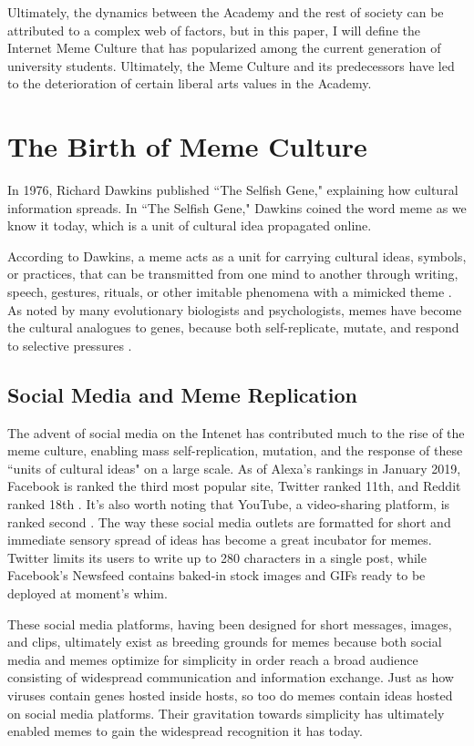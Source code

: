 \documentclass[12pt,letterpaper]{article}
\begin{document}
Ultimately, the dynamics between the Academy and the rest of society can be attributed to a complex web of factors, but in this paper, I will define the Internet Meme Culture that has popularized among the current generation of university students.  Ultimately, the Meme Culture and its predecessors have led to the deterioration of certain liberal arts values in the Academy.

\section{The Birth of Meme Culture}

In 1976, Richard Dawkins published ``The Selfish Gene," explaining how cultural information spreads.  In ``The Selfish Gene," Dawkins coined the word meme as we know it today, which is a unit of cultural idea propagated online.

According to Dawkins, a meme acts as a unit for carrying cultural ideas, symbols, or practices, that can be transmitted from one mind to another through writing, speech, gestures, rituals, or other imitable phenomena with a mimicked theme \cite{noauthor_selfish_2019}.  As noted by many evolutionary biologists and psychologists, memes have become the cultural analogues to genes, because both self-replicate, mutate, and respond to selective pressures \cite{noauthor_pdf_nodate}.

\subsection{Social Media and Meme Replication}
The advent of social media on the Intenet has contributed much to the rise of the meme culture, enabling mass self-replication, mutation, and the response of these ``units of cultural ideas" on a large scale.  As of Alexa's rankings in January 2019, Facebook is ranked the third most popular site, Twitter ranked 11th, and Reddit ranked 18th \cite{noauthor_list_2019}.  It's also worth noting that YouTube, a video-sharing platform, is ranked second \cite{noauthor_list_2019}.  The way these social media outlets are formatted for short and immediate sensory spread of ideas has become a great incubator for memes.  Twitter limits its users to write up to 280 characters in a single post, while Facebook's Newsfeed contains baked-in stock images and GIFs ready to be deployed at moment's whim.

These social media platforms, having been designed for short messages, images, and clips, ultimately exist as breeding grounds for memes because both social media and memes optimize for simplicity in order reach a broad audience consisting of widespread communication and information exchange.  Just as how viruses contain genes hosted inside hosts, so too do memes contain ideas hosted on social media platforms.  Their gravitation towards simplicity has ultimately enabled memes to gain the widespread recognition it has today.
\end{document}
